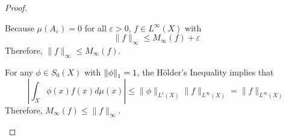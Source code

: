 \begin{proof}
\begin{enumerate}[label=(\roman*)]
		\noindent Because $\mu(A_{\varepsilon}) = 0$ for all $\varepsilon > 0$, $f \in L^\infty(X)$ with
		\begin{equation*}
			\|f\|_{\infty} \leq M_{\infty}(f)+\varepsilon
		\end{equation*}
		Therefore, $\|f\|_{\infty} \leq M_{\infty}(f)$. 

		\noindent For any $\phi \in S_0(X)$ with $\left\lVert\phi\right\lVert_1 = 1$, the H\"older's Inequality implies that
		\begin{equation*}
			\left|\int_X \phi(x) f(x) d \mu(x)\right| \leq\|\phi\|_{L^1(X)}\|f\|_{L^{\infty}(X)}=\|f\|_{L^{\infty}(X)}
		\end{equation*}
		Therefore, $M_{\infty}(f) \leq\|f\|_{\infty}$.
	\end{enumerate}
\end{proof}

